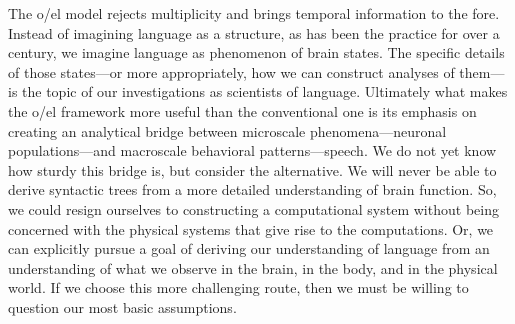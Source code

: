   The o/el model rejects multiplicity and brings temporal information to the fore. Instead of imagining language as a structure, as has been the practice for over a century, we imagine language as phenomenon of brain states. The specific details of those states—or more appropriately, how we can construct analyses of them—is the topic of our investigations as scientists of language. Ultimately what makes the o/el framework more useful than the conventional one is its emphasis on creating an analytical bridge between microscale phenomena—neuronal populations—and macroscale behavioral patterns—speech. We do not yet know how sturdy this bridge is, but consider the alternative. We will never be able to derive syntactic trees from a more detailed understanding of brain function. So, we could resign ourselves to constructing a computational system without being concerned with the physical systems that give rise to the computations. Or, we can explicitly pursue a goal of deriving our understanding of language from an understanding of what we observe in the brain, in the body, and in the physical world. If we choose this more challenging route, then we must be willing to question our most basic assumptions.

